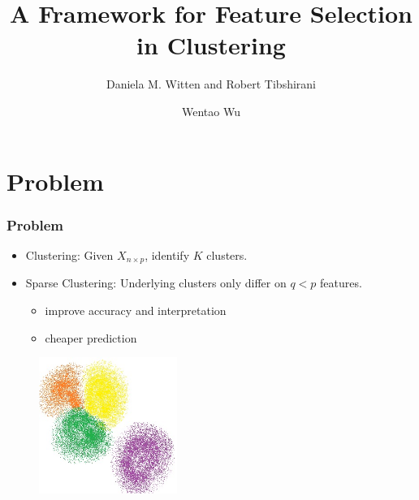 \documentclass{beamer}
\title[Sparse Clustering]{A Framework for Feature Selection in Clustering} %
\author{Daniela M. Witten and Robert Tibshirani} %
\institute[] %
{
Stanford University \\ %
\medskip
\textit{} %
}
\date{Wentao Wu} %
\begin{document}
\begin{frame}
\titlepage %
\end{frame}



\section{Problem} %

\begin{frame}
\frametitle{Problem}

\begin{itemize}
    \item Clustering: Given $X_{n\times p}$, identify $K$ clusters.
    \item Sparse Clustering: Underlying clusters only differ on $q < p$ features.
          \begin{itemize}
            \item improve accuracy and interpretation
            \item cheaper prediction
          \end{itemize}
\end{itemize}

\begin{figure}[h!]
  \centering
    \includegraphics[width=0.4\textwidth]{cluster.jpeg}
\end{figure}


\end{frame}
\end{document}
